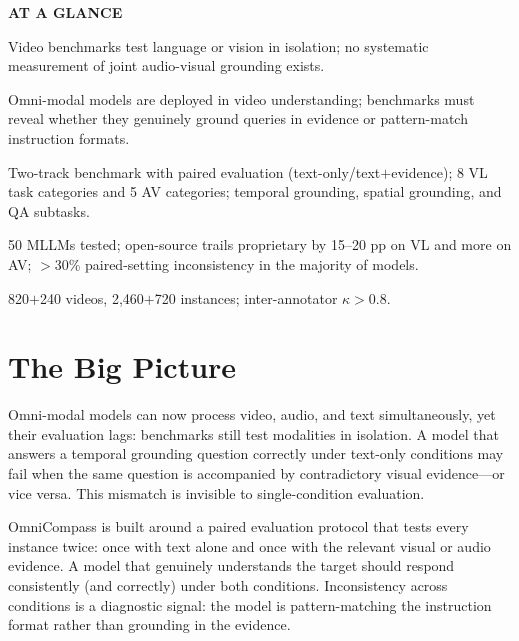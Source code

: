 \documentclass[10pt,twocolumn]{article}
\begin{document}
\begin{mdframed}[backgroundcolor=boxgray,linecolor=rulered,linewidth=1pt,
    innerleftmargin=6pt,innerrightmargin=6pt,
    innertopmargin=6pt,innerbottommargin=6pt]
\textbf{\small AT A GLANCE}\par\vspace{4pt}
\begin{description}[leftmargin=0pt,labelsep=4pt,itemsep=2pt,parsep=0pt,
    font=\small\bfseries]
  \item[Problem:] Video benchmarks test language or vision in isolation;
    no systematic measurement of joint audio-visual grounding exists.
  \item[Why it matters:] Omni-modal models are deployed in video
    understanding; benchmarks must reveal whether they genuinely ground
    queries in evidence or pattern-match instruction formats.
  \item[Method:] Two-track benchmark with paired evaluation
    (text-only/text$+$evidence); 8 VL task categories and 5 AV
    categories; temporal grounding, spatial grounding, and QA subtasks.
  \item[Result:] 50 MLLMs tested; open-source trails proprietary by
    15--20 pp on VL and more on AV; $>$30\% paired-setting inconsistency
    in the majority of models.
  \item[Evidence:] 820$+$240 videos, 2{,}460$+$720 instances;
    inter-annotator $\kappa > 0.8$.
\end{description}
\end{mdframed}

\section{The Big Picture}

Omni-modal models can now process video, audio, and text simultaneously,
yet their evaluation lags: benchmarks still test modalities in isolation.
A model that answers a temporal grounding question correctly under
text-only conditions may fail when the same question is accompanied by
contradictory visual evidence---or vice versa. This mismatch is invisible
to single-condition evaluation.

OmniCompass is built around a paired evaluation protocol that tests every
instance twice: once with text alone and once with the relevant visual or
audio evidence. A model that genuinely understands the target should
respond consistently (and correctly) under both conditions. Inconsistency
across conditions is a diagnostic signal: the model is pattern-matching
the instruction format rather than grounding in the evidence.
\end{document}
